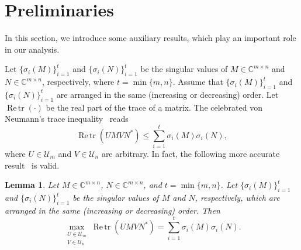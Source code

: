 \documentclass[11pt]{article}
\newtheorem{lemma}{Lemma}[section]
\DeclareMathOperator*{\Retr}{Re\,tr}
\begin{document}
\section{Preliminaries}

\label{sec:pre}

\setcounter{equation}{0}

In this section, we introduce some auxiliary results, which play an important role in our analysis.

Let $\{\sigma_{i}(M)\}_{i=1}^{t}$ and $\{\sigma_{i}(N)\}_{i=1}^{t}$ be the singular values of $M\in\mathbb{C}^{m\times n}$ and $N\in\mathbb{C}^{m\times n}$, respectively, where $t=\min\{m,n\}$. Assume that $\{\sigma_{i}(M)\}_{i=1}^{t}$ and $\{\sigma_{i}(N)\}_{i=1}^{t}$ are arranged in the same (increasing or decreasing) order. Let $\Retr(\cdot)$ be the real part of the trace of a matrix. The celebrated von Neumann's trace inequality~\cite{Neumann1937} reads
\begin{displaymath}
\Retr(UMVN^{\ast})\leq\sum_{i=1}^{t}\sigma_{i}(M)\sigma_{i}(N),
\end{displaymath}
where $U\in\mathscr{U}_{m}$ and $V\in\mathscr{U}_{n}$ are arbitrary. In fact, the following more accurate result~\cite{Neumann1937} is valid.

\begin{lemma}
Let $M\in\mathbb{C}^{m\times n}$, $N\in\mathbb{C}^{m\times n}$, and $t=\min\{m,n\}$. Let $\{\sigma_{i}(M)\}_{i=1}^{t}$ and $\{\sigma_{i}(N)\}_{i=1}^{t}$ be the singular values of $M$ and $N$, respectively, which are arranged in the same (increasing or decreasing) order. Then
\begin{equation}\label{von}
\max_{\substack{U\in\mathscr{U}_{m}\\ V\in\mathscr{U}_{n}}}\Retr(UMVN^{\ast})=\sum_{i=1}^{t}\sigma_{i}(M)\sigma_{i}(N).
\end{equation}
\end{lemma}
\end{document}
